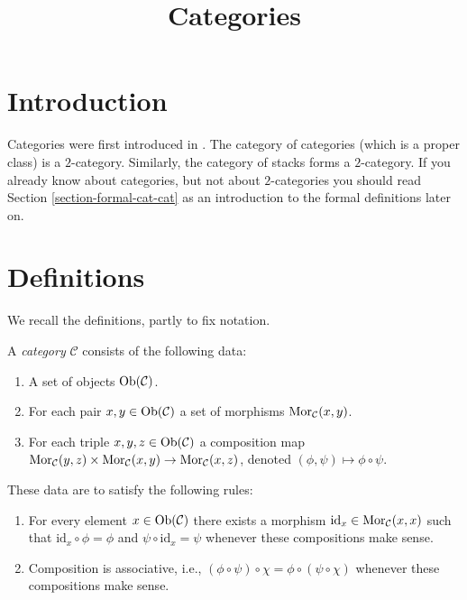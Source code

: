 


%


\title{Categories}


\maketitle

\label{section-phantom}

\tableofcontents

\section{Introduction}
\label{section-introduction}

\noindent
Categories were first introduced in \cite{GenEqui}.
The category of categories (which is a proper class)
is a $2$-category. Similarly, the category of stacks
forms a $2$-category. If you already know
about categories, but not about $2$-categories you
should read
Section \ref{section-formal-cat-cat}
as an introduction to the formal definitions later on.

\section{Definitions}
\label{section-definition-categories}

\noindent
We recall the definitions, partly to fix notation.

\begin{definition}
\label{definition-category}
A {\it category} $\mathcal{C}$ consists of the following data:
\begin{enumerate}
\item A set of objects $\mathop{\mathrm{Ob}}\nolimits(\mathcal{C})$.
\item For each pair $x, y \in \mathop{\mathrm{Ob}}\nolimits(\mathcal{C})$ a set of morphisms
$\mathop{\mathrm{Mor}}\nolimits_\mathcal{C}(x, y)$.
\item For each triple $x, y, z\in \mathop{\mathrm{Ob}}\nolimits(\mathcal{C})$ a composition
map $ \mathop{\mathrm{Mor}}\nolimits_\mathcal{C}(y, z) \times \mathop{\mathrm{Mor}}\nolimits_\mathcal{C}(x, y)
\to \mathop{\mathrm{Mor}}\nolimits_\mathcal{C}(x, z) $, denoted $(\phi, \psi) \mapsto
\phi \circ \psi$.
\end{enumerate}
These data are to satisfy the following rules:
\begin{enumerate}
\item For every element $x\in \mathop{\mathrm{Ob}}\nolimits(\mathcal{C})$ there exists a
morphism $\text{id}_x\in \mathop{\mathrm{Mor}}\nolimits_\mathcal{C}(x, x)$ such that
$\text{id}_x \circ \phi = \phi$ and $\psi \circ \text{id}_x = \psi $ whenever
these compositions make sense.
\item Composition is associative, i.e., $(\phi \circ \psi) \circ \chi =
\phi \circ ( \psi \circ \chi)$ whenever these compositions make sense.
\end{enumerate}
\end{definition}

